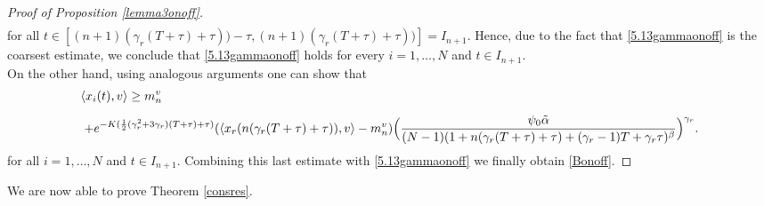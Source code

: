 \documentclass[11pt]{article}
\begin{document}
\begin{proof}[Proof of Proposition \ref{lemma3onoff}]
\begin{equation}
\begin{array}{l}
        \end{array}
		\end{equation}
		for all $t\in [(n+1)(\gamma_r(T+\tau)+\tau))-\tau,(n+1)(\gamma_r(T+\tau)+\tau))]=I_{n+1}$. Hence, due to the fact that \eqref{5.13gammaonoff} is the coarsest estimate, we conclude that \eqref{5.13gammaonoff} holds for every $i=1,\dots,N$ and $t\in I_{n+1}$. 
\\On the other hand, using analogous arguments one can show that
		\begin{equation*}
		    \begin{array}{l}
		    	\vspace{0.3cm}\displaystyle{\langle x_{i}(t),v\rangle \geq m^v_{n}}\\
		    	\displaystyle{\hspace{0.1cm}+e^{-K(\frac{1}{2}(\gamma_{r}^2+3\gamma_r)(T+\tau)+\tau)}(\langle x_r(n(\gamma_r(T+\tau)+\tau)),v \rangle-m_{n}^v)\Big(\frac{\psi_{0}\tilde{\alpha}}{(N-1)(1+n(\gamma_r(T+\tau)+\tau)+(\gamma_r-1)T+\gamma_r\tau)^\beta}\Big )^{\gamma_r}.}
		    \end{array}
		\end{equation*}
		for all $i=1,\dots,N$ and $t\in I_{n+1}$. Combining this last estimate with \eqref{5.13gammaonoff} we finally obtain \eqref{Bonoff}.
	\end{proof} 
    We are now able to prove Theorem \ref{consres}.
\end{document}
